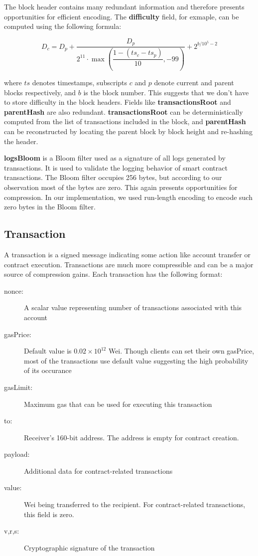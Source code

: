 The block header contains many redundant information and therefore presents opportunities for efficient encoding.
The \textbf{difficulty} field, for exmaple, can be computed using the following formula:

\begin{equation}
D_{c} = D_{p} + \dfrac{D_{p}}{2^{11}\cdot\max\left(\dfrac{1 - (ts_{c} - ts_{p})}{10}, -99\right)} + 2^{b/10^5-2}
\end{equation}

where $ts$ denotes timestamps, subscripts $c$ and $p$ denote current and parent blocks respectively, and $b$ is the block number.
This suggests that we don't have to store difficulty in the block headers.
Fields like \textbf{transactionsRoot} and \textbf{parentHash} are also redundant.
\textbf{transactionsRoot} can be deterministically computed from the list of transactions included in the block,
and \textbf{parentHash} can be reconstructed by locating the parent block by block height and re-hashing the header.

\textbf{logsBloom} is a Bloom filter used as a signature of all logs generated by transactions.
It is used to validate the logging behavior of smart contract transactions. The Bloom filter occupies 256 bytes,
but according to our observation most of the bytes are zero. This again presents opportunities for compression.
In our implementation, we used run-length encoding to encode such zero bytes in the Bloom filter.

\subsection{Transaction}

A transaction is a signed message indicating some action like account transfer or contract execution.
Transactions are much more compressible and can be a major source of compression gains.
Each transaction has the following format:
\begin{description}
  \item[nonce:] A scalar value representing number of transactions associated with this account
  \item[gasPrice:] Default value is $0.02\times10^{12}$ Wei. Though clients can set their own gasPrice, most of the transactions use default value suggesting the high probability of its occurance
  \item[gasLimit:] Maximum gas that can be used for executing this transaction
  \item[to:] Receiver's 160-bit address. The address is empty for contract creation.
  \item[payload:] Additional data for contract-related transactions
  \item[value:] Wei being transferred to the recipient. For contract-related transactions, this field is zero.
  \item[v,r,s:] Cryptographic signature of the transaction
\end{description}

